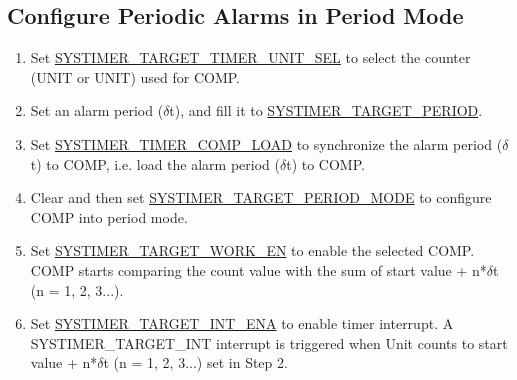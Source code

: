 \documentclass[main\_\_EN.tex]{subfiles}
\begin{document}
\subsection{Configure Periodic Alarms in Period Mode}
\begin{enumerate}
    \item Set \hyperref[fielddesc:SYSTIMERTARGET0TIMERUNITSEL]{SYSTIMER\_TARGET\_TIMER\_UNIT\_SEL} to select the counter (UNIT or UNIT) used for COMP.
    \item Set an alarm period ($\delta$t), and fill it to \hyperref[fielddesc:SYSTIMERTARGET0PERIOD]{SYSTIMER\_TARGET\_PERIOD}.
    \item Set \hyperref[fielddesc:SYSTIMERTIMERCOMP0LOAD]{SYSTIMER\_TIMER\_COMP\_LOAD} to synchronize the alarm period ($\delta$t) to COMP, i.e. load the alarm period ($\delta$t) to COMP.
    \item Clear and then set \hyperref[fielddesc:SYSTIMERTARGET0PERIODMODE]{SYSTIMER\_TARGET\_PERIOD\_MODE} to configure COMP into period mode.
    \item Set \hyperref[fielddesc:SYSTIMERTARGET0WORKEN]{SYSTIMER\_TARGET\_WORK\_EN} to enable the selected COMP. COMP starts comparing the count value with the sum of start value + n*$\delta$t (n = 1, 2, 3...).
    \item Set \hyperref[fielddesc:SYSTIMERTARGET0INTENA]{SYSTIMER\_TARGET\_INT\_ENA} to enable timer interrupt. A SYSTIMER\_TARGET\_INT interrupt is triggered when Unit counts to start value + n*$\delta$t (n = 1, 2, 3...) set in Step 2.
\end{enumerate}
\end{document}
